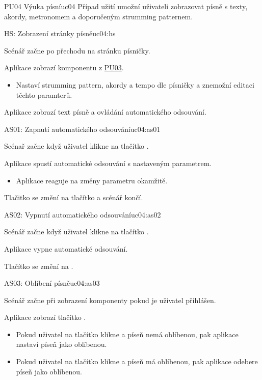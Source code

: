 \begin{usecase}{PU04 Výuka písní}{uc04}
    Případ užití umožní uživateli zobrazovat písně s texty, akordy, metronomem a doporučeným strumming patternem.

    \begin{scenario}{HS: Zobrazení stránky písně}{uc04:hs}
        \item Scénář začne po přechodu na stránku písničky.
        \item Aplikace zobrazí komponentu z \hyperref[uc03]{PU03}.
        \begin{itemize}
            \item Nastaví strumming pattern, akordy a tempo dle písničky a znemožní editaci těchto paramterů.
        \end{itemize}
        \item Aplikace zobrazí text písně a ovládání automatického odsouvání.
    \end{scenario}
   
    \begin{scenario}{AS01: Zapnutí automatického odsouvání}{uc04:as01}
        \item Scénař začne když uživatel klikne na tlačítko .
        \item Aplikace spustí automatické odsouvání s nastaveným parametrem.
        \begin{itemize}
            \item Aplikace reaguje na změny parametru okamžitě.
        \end{itemize}
        \item Tlačitko  se změní na tlačítko  a scénář končí.
    \end{scenario}

    \begin{scenario}{AS02: Vypnutí automatického odsouvání}{uc04:as02}
        \item Scénář začne když uživatel klikne na tlačítko .
        \item Aplikace vypne automatické odsouvání.
        \item Tlačítko  se změní na .
    \end{scenario}

    \begin{scenario}{AS03: Oblíbení písně}{uc04:as03}
        \item Scénář začne při zobrazení komponenty pokud je uživatel přihlášen.
        \item Aplikace zobrazí tlačítko .
        \begin{itemize}
            \item Pokud uživatel na tlačítko klikne a píseň nemá oblíbenou, pak aplikace nastaví píseň jako oblíbenou.
            \item Pokud uživatel na tlačítko klikne a píseň má oblíbenou, pak aplikace odebere píseň jako oblíbenou.
        \end{itemize}
    \end{scenario}
\end{usecase}
